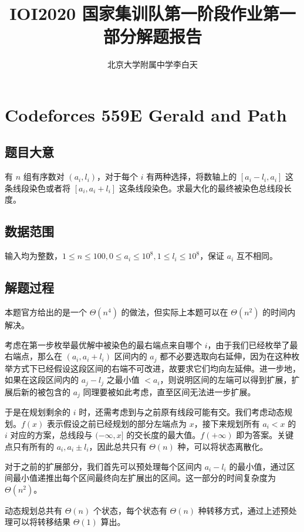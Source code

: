 \documentclass[12pt]{ctexart}
\title{IOI2020 国家集训队第一阶段作业第一部分解题报告}
\author{北京大学附属中学\quad 李白天}
\begin{document}
\maketitle

\section{Codeforces 559E Gerald and Path}

\subsection{题目大意}

有 $n$ 组有序数对 $(a_i, l_i)$，对于每个 $i$ 有两种选择，将数轴上的 $[a_i - l_i, a_i]$ 这条线段染色或者将 $[a_i, a_i + l_i]$ 这条线段染色。求最大化的最终被染色总线段长度。

\subsection{数据范围}

输入均为整数，$1\le n\le 100, 0\le a_i\le 10^8, 1\le l_i\le 10^8$，保证 $a_i$ 互不相同。

\subsection{解题过程}

本题官方给出的是一个 $\Theta(n^4)$ 的做法，但实际上本题可以在 $\Theta(n^2)$ 的时间内解决。

考虑在第一步枚举最优解中被染色的最右端点来自哪个 $i$，由于我们已经枚举了最右端点，那么在 $(a_i, a_i + l_i)$ 区间内的 $a_j$ 都不必要选取向右延伸，因为在这种枚举方式下已经假设这段区间的右端不可改进，故要求它们均向左延伸。进一步地，如果在这段区间内的 $a_j - l_j$ 之最小值 $< a_i$，则说明区间的左端可以得到扩展，扩展后新的被包含的 $a_j$ 同理要被如此考虑，直至区间无法进一步扩展。

于是在规划剩余的 $i$ 时，还需考虑到与之前原有线段可能有交。我们考虑动态规划。$f(x)$ 表示假设之前已经规划的部分左端点为 $x$，接下来规划所有 $a_i < x$ 的 $i$ 对应的方案，总线段与 $(-\infty, x]$ 的交长度的最大值。$f(+\infty)$ 即为答案。关键点只有所有的 $a_i, a_i\pm l_i$，因此总共只有 $\Theta(n)$ 种，可以将状态离散化。

对于之前的扩展部分，我们首先可以预处理每个区间内 $a_i - l_i$ 的最小值，通过区间最小值递推出每个区间最终向左扩展出的区间。这一部分的时间复杂度为 $\Theta(n^2)$。

动态规划总共有 $\Theta(n)$ 个状态，每个状态有 $\Theta(n)$ 种转移方式，通过上述预处理可以将转移结果 $\Theta(1)$ 算出。
\end{document}
